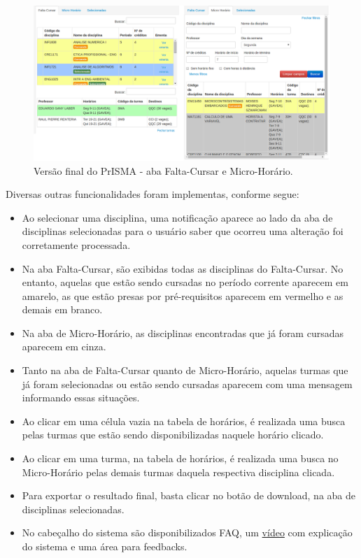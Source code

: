 \documentclass[graduacao,brazil]{ThesisPUC}
\begin{document}
\begin{figure}[H]
    \centering
    \includegraphics[width=\linewidth]{img/v3_abas.png}
    \caption{Versão final do PrISMA - aba Falta-Cursar e Micro-Horário.}
\end{figure}

Diversas outras funcionalidades foram implementas, conforme segue:

\begin{itemize}

	\item Ao selecionar uma disciplina, uma notificação aparece ao lado da aba de disciplinas selecionadas para o usuário saber que ocorreu uma alteração foi corretamente processada.
	\item Na aba Falta-Cursar, são exibidas todas as disciplinas do Falta-Cursar. No entanto, aquelas que estão sendo cursadas no período corrente aparecem em amarelo, as que estão presas por pré-requisitos aparecem em vermelho e as demais em branco.
	\item Na aba de Micro-Horário, as disciplinas encontradas que já foram cursadas aparecem em cinza.
	\item Tanto na aba de Falta-Cursar quanto de Micro-Horário, aquelas turmas que já foram selecionadas ou estão sendo cursadas aparecem com uma mensagem informando essas situações.
	\item Ao clicar em uma célula vazia na tabela de horários, é realizada uma busca pelas turmas que estão sendo disponibilizadas naquele horário clicado.
	\item Ao clicar em uma turma, na tabela de horários, é realizada uma busca no Micro-Horário pelas demais turmas daquela respectiva disciplina clicada.
	\item Para exportar o resultado final, basta clicar no botão de download, na aba de disciplinas selecionadas.
	\item No cabeçalho do sistema são disponibilizados FAQ, um \href{https://www.youtube.com/watch?v=XHF8WOJ6xI0}{vídeo} com explicação do sistema e uma área para feedbacks.

\end{itemize}
\end{document}
